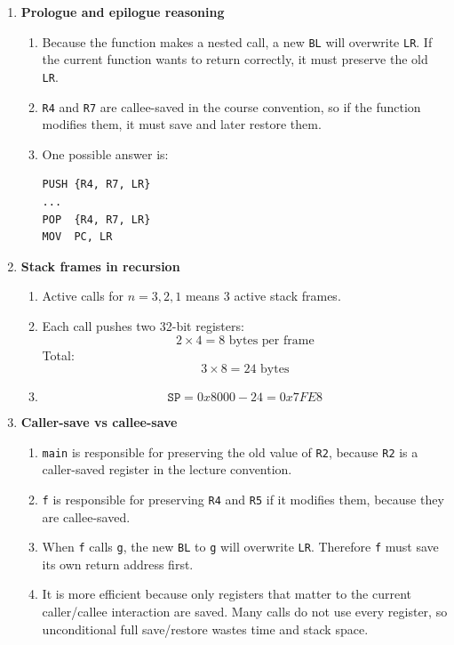 \documentclass[11pt]{article}
\begin{document}
\begin{enumerate}[label=\textbf{B\arabic*.}]
  \item \textbf{Prologue and epilogue reasoning}
  \begin{enumerate}[label=(\alph*)]
    \item Because the function makes a nested call, a new \texttt{BL} will overwrite \texttt{LR}. If the current function wants to return correctly, it must preserve the old \texttt{LR}.
    \item \texttt{R4} and \texttt{R7} are callee-saved in the course convention, so if the function modifies them, it must save and later restore them.
    \item One possible answer is:
\begin{verbatim}
PUSH {R4, R7, LR}
...
POP  {R4, R7, LR}
MOV  PC, LR
\end{verbatim}
  \end{enumerate}

  \item \textbf{Stack frames in recursion}
  \begin{enumerate}[label=(\alph*)]
    \item Active calls for \(n=3,2,1\) means 3 active stack frames.
    \item Each call pushes two 32-bit registers:
    \[
      2 \times 4 = 8 \text{ bytes per frame}
    \]
    Total:
    \[
      3 \times 8 = 24 \text{ bytes}
    \]
    \item
    \[
      \texttt{SP} = 0x8000 - 24 = 0x7FE8
    \]
  \end{enumerate}

  \item \textbf{Caller-save vs callee-save}
  \begin{enumerate}[label=(\alph*)]
    \item \texttt{main} is responsible for preserving the old value of \texttt{R2}, because \texttt{R2} is a caller-saved register in the lecture convention.
    \item \texttt{f} is responsible for preserving \texttt{R4} and \texttt{R5} if it modifies them, because they are callee-saved.
    \item When \texttt{f} calls \texttt{g}, the new \texttt{BL} to \texttt{g} will overwrite \texttt{LR}. Therefore \texttt{f} must save its own return address first.
    \item It is more efficient because only registers that matter to the current caller/callee interaction are saved. Many calls do not use every register, so unconditional full save/restore wastes time and stack space.
  \end{enumerate}
\end{enumerate}
\end{document}
